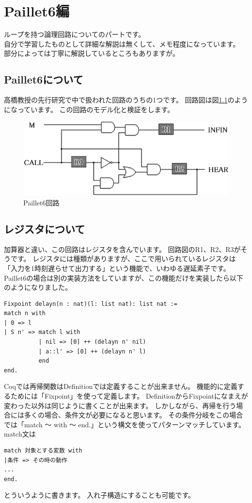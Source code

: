 \documentclass{jsbook}
\begin{document}
\chapter{Paillet6編}
ループを持つ論理回路についてのパートです。\\
自分で学習したものとして詳細な解説は無くして、メモ程度になっています。
部分によっては丁寧に解説しているところもありますが。
\newpage
\section{Paillet6について}
高橋教授の先行研究で中で扱われた回路のうちの1つです。
回路図は図\ref{paillet6}のようになっています。
この回路のモデル化と検証をします。
\begin{figure}[htbp]
\begin{center}
  \includegraphics[width=38zw]{image/Paillet6_AE.eps}
  \caption{Paillet6回路}
  \label{paillet6}
\end{center}
\end{figure}
\section{レジスタについて \label{レジスタ}}
加算器と違い、この回路はレジスタを含んでいます。
回路図のR1、R2、R3がそうです。
レジスタには種類がありますが、ここで用いられているレジスタは「入力を1時刻遅らせて出力する」という機能で、いわゆる遅延素子です。
Paillet6の場合は別の実装方法をしていますが、この機能だけを実装したら以下のようになりました。
\begin{verbatim}
Fixpoint delayn(n : nat)(l: list nat): list nat :=
match n with
| 0 => l
| S n' => match l with
          | nil => [0] ++ (delayn n' nil)
          | a::l' => [0] ++ (delayn n' l)
          end
end.
\end{verbatim}
Coqでは再帰関数はDefinitionでは定義することが出来ません。
機能的に定義するためには「Fixpoint」を使って定義します。
DefinitionからFixpointになまえが変わった以外は同じように書くことが出来ます。
しかしながら、再帰を行う場合には多くの場合、条件文が必要になると思います。
その条件分岐をこの場合では「match ～ with ～ end.」という構文を使ってパターンマッチしています。
match文は
\begin{verbatim}
match 対象とする変数 with
|条件 => その時の動作
...
end.
\end{verbatim}
とういうように書きます。
入れ子構造にすることも可能です。
\end{document}
